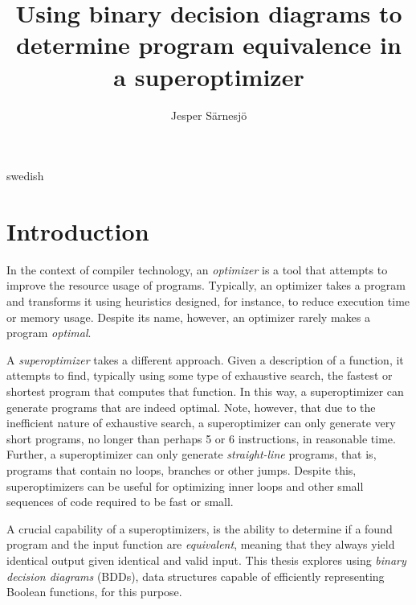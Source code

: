 \documentclass[a4paper,11pt]{kth-mag}
\title{Using binary decision diagrams to determine program equivalence in a superoptimizer}
\subtitle{}
\author{Jesper Särnesjö}
\date{}
\begin{document}
\frontmatter

\pagestyle{empty}

\removepagenumbers

\maketitle


\begin{abstract}
\end{abstract}

\clearpage

\begin{foreignabstract}{swedish}
\end{foreignabstract}

\clearpage

\tableofcontents*

\mainmatter

\pagestyle{newchap}

\chapter{Introduction}
\label{ch:introduction}

In the context of compiler technology, an \emph{optimizer} is a tool that attempts to improve the resource usage of programs.
Typically, an optimizer takes a program and transforms it using heuristics designed, for instance, to reduce execution time or memory usage.
Despite its name, however, an optimizer rarely makes a program \emph{optimal}.

A \emph{superoptimizer} takes a different approach.
Given a description of a function, it attempts to find, typically using some type of exhaustive search, the fastest or shortest program that computes that function.
In this way, a superoptimizer can generate programs that are indeed optimal.
Note, however, that due to the inefficient nature of exhaustive search, a superoptimizer can only generate very short programs, no longer than perhaps 5 or 6 instructions, in reasonable time.
Further, a superoptimizer can only generate \emph{straight-line} programs, that is, programs that contain no loops, branches or other jumps.
Despite this, superoptimizers can be useful for optimizing inner loops and other small sequences of code required to be fast or small.

A crucial capability of a superoptimizers, is the ability to determine if a found program and the input function are \emph{equivalent}, meaning that they always yield identical output given identical and valid input.
This thesis explores using \emph{binary decision diagrams} (BDDs), data structures capable of efficiently representing Boolean functions, for this purpose.
\end{document}

